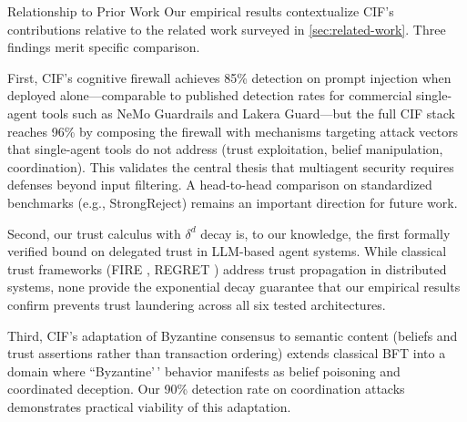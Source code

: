 \documentclass[
  ignorenonframetext,
]{beamer}
\newcounter{none} %
\begin{document}
\begin{frame}{Relationship to Prior Work}
\protect{}\label{relationship-to-prior-work}
Our empirical results contextualize CIF's contributions relative to the
related work surveyed in \cref{sec:related-work}. Three findings merit
specific comparison.

First, CIF's cognitive firewall achieves 85\% detection on prompt
injection when deployed alone---comparable to published detection rates
for commercial single-agent tools such as NeMo Guardrails
\cite{rebedea2023nemo} and Lakera Guard---but the full CIF stack reaches
96\% by composing the firewall with mechanisms targeting attack vectors
that single-agent tools do not address (trust exploitation, belief
manipulation, coordination). This validates the central thesis that
multiagent security requires defenses beyond input filtering. A
head-to-head comparison on standardized benchmarks (e.g., StrongReject)
remains an important direction for future work.

Second, our trust calculus with \(\delta^d\) decay is, to our knowledge,
the first formally verified bound on delegated trust in LLM-based agent
systems. While classical trust frameworks (FIRE \cite{huynh2006fire},
REGRET \cite{sabater2001regret}) address trust propagation in
distributed systems, none provide the exponential decay guarantee that
our empirical results confirm prevents trust laundering across all six
tested architectures.

Third, CIF's adaptation of Byzantine consensus to semantic content
(beliefs and trust assertions rather than transaction ordering) extends
classical BFT \cite{lamport1982byzantine, castro1999practical} into a
domain where ``Byzantine'\,' behavior manifests as belief poisoning and
coordinated deception. Our 90\% detection rate on coordination attacks
demonstrates practical viability of this adaptation.
\end{frame}
\end{document}
